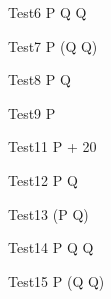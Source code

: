 \begin{circus}
   \circprocess Test6 \circdef  P \circseq Q \circseq {} \rcirctime \circstartby Q\\
\end{circus}
 
\begin{circus}
   \circprocess Test7 \circdef  P \circseq (Q \circseq {} \rcirctime \circstartby Q)\\
\end{circus} 
 
 \begin{circus}
    \circprocess Test8 \circdef  {} \rcirctime \circstartby P \circseq {} \rcirctime \circstartby Q\\
 \end{circus}


 
\begin{circus}
   \circprocess Test9 \circdef  P \circendby {} \rcirctime   \\
\end{circus}
% 



\begin{circus}
   \circprocess Test11 \circdef  P \circendby {} + 20 \rcirctime   \\
\end{circus}

 
\begin{circus}
   \circprocess Test12 \circdef  P \circseq Q \circendby {} \rcirctime  \\
\end{circus}

\begin{circus}
   \circprocess Test13 \circdef  (P \circseq Q) \circendby {} \rcirctime \\
\end{circus}


\begin{circus}
    \circprocess Test14 \circdef  P \circseq Q \circendby {} \rcirctime \circseq Q \\
 \end{circus}

\begin{circus}
    \circprocess Test15 \circdef  P \circseq (Q \circendby {} \rcirctime \circseq Q)\\
\end{circus}

